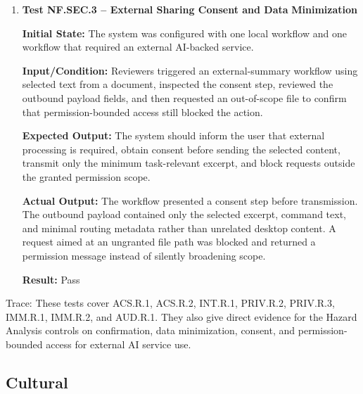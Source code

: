 \documentclass[12pt]{article}
\begin{document}
\begin{enumerate}
    \textbf{Result:} Pass

    \item \textbf{Test NF.SEC.3 -- External Sharing Consent and Data}
    \textbf{Minimization}
    
    \textbf{Initial State:} The system was configured with one local
    workflow and one workflow that required an external AI-backed
    service.
    
    \textbf{Input/Condition:} Reviewers triggered an external-summary
    workflow using selected text from a document, inspected the consent
    step, reviewed the outbound payload fields, and then requested an
    out-of-scope file to confirm that permission-bounded access still
    blocked the action.
    
    \textbf{Expected Output:} The system should inform the user that
    external processing is required, obtain consent before sending the
    selected content, transmit only the minimum task-relevant excerpt,
    and block requests outside the granted permission scope.
    
    \textbf{Actual Output:} The workflow presented a consent step
    before transmission. The outbound payload contained only the
    selected excerpt, command text, and minimal routing metadata rather
    than unrelated desktop content. A request aimed at an ungranted
    file path was blocked and returned a permission message instead of
    silently broadening scope.
    
    \textbf{Result:} Pass
\end{enumerate}

\noindent Trace: These tests cover ACS.R.1, ACS.R.2, INT.R.1,
PRIV.R.2, PRIV.R.3, IMM.R.1, IMM.R.2, and AUD.R.1. They also give
direct evidence for the Hazard Analysis controls on confirmation, data
minimization, consent, and permission-bounded access for external
AI service use.

\subsection{Cultural}
\end{document}
